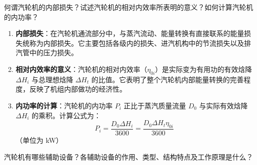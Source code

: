 \begin{problem}
何谓汽轮机的内部损失？试述汽轮机的相对内效率所表明的意义？如何计算汽轮机的内功率？
\end{problem}

\begin{solution}
\begin{enumerate}
  \item \textbf{内部损失}：在汽轮机通流部分中，与蒸汽流动、能量转换有直接联系的能量损失统称为内部损失。它主要包括各级内的损失、进汽机构中的节流损失以及排汽管中的压力损失。
  \item \textbf{相对内效率的意义}：汽轮机的相对内效率（\(\eta_{0i}\)）是实际变为有用功的有效焓降 \(\Delta H_i\) 与总理想焓降 \(\Delta H_t\) 的比值。它表明了整个汽轮机内部能量转换的完善程度，反映了机组内部做功的经济性。
  \item \textbf{内功率的计算}：汽轮机的内功率 \(P_i\) 正比于蒸汽质量流量 \(D_0\) 与实际有效焓降 \(\Delta H_i\) 的乘积。计算公式为：
  \begin{equation*}
    P_i = \frac{D_0 \Delta H_i}{3600} = \frac{D_0 \Delta H_t \eta_{0i}}{3600}
  \end{equation*}
  （单位为 \unit{kW}）
\end{enumerate}
\end{solution}

\begin{problem}
汽轮机有哪些辅助设备？各辅助设备的作用、类型、结构特点及工作原理是什么？
\end{problem}

